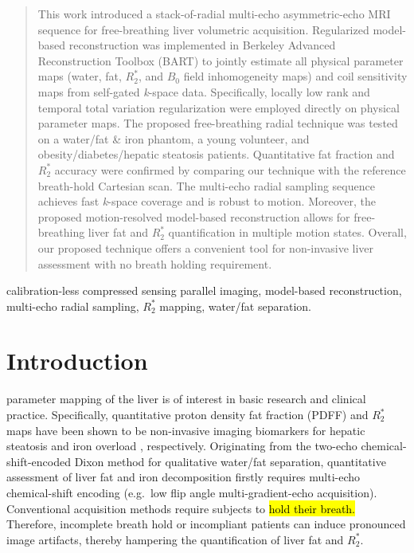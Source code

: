 \documentclass[journal,twoside,web]{ieeecolor}
\begin{document}
\begin{abstract}

This work introduced a stack-of-radial multi-echo asymmetric-echo MRI sequence 
for free-breathing liver volumetric acquisition. 
Regularized model-based reconstruction was implemented 
in Berkeley Advanced Reconstruction Toolbox (BART) 
to jointly estimate all physical parameter maps 
(water, fat, $R_2^*$, and $B_0$ field inhomogeneity maps) 
and coil sensitivity maps from self-gated \textit{k}-space data. 
Specifically, locally low rank and temporal total variation regularization 
were employed directly on physical parameter maps. 
The proposed free-breathing radial technique 
was tested on a water/fat \& iron phantom, a young volunteer, 
and obesity/diabetes/hepatic steatosis patients. 
Quantitative fat fraction and $R_2^*$ accuracy were confirmed 
by comparing our technique with the reference breath-hold Cartesian scan.
The multi-echo radial sampling sequence achieves 
fast \textit{k}-space coverage and is robust to motion. 
Moreover, the proposed motion-resolved model-based reconstruction 
allows for free-breathing liver fat and $R_2^*$ quantification 
in multiple motion states. 
Overall, our proposed technique offers a convenient tool 
for non-invasive liver assessment with no breath holding requirement.

\end{abstract}

\begin{IEEEkeywords}
calibration-less compressed sensing parallel imaging, model-based reconstruction, multi-echo radial sampling, $R_2^*$ mapping, water/fat separation.
\end{IEEEkeywords}

\section{Introduction}
\label{sec:introduction}

 parameter mapping of the liver is of interest 
in basic research and clinical practice. Specifically, quantitative 
proton density fat fraction (PDFF) and $R_2^*$ maps have been shown 
to be non-invasive imaging biomarkers for hepatic 
steatosis \cite{caussy_2018_fat,hu_2020_obesity} and 
iron overload \cite{wood_2011_iron,hernando_2014_iron}, respectively. 
Originating from the two-echo chemical-shift-encoded Dixon method 
\cite{dixon_1984_wf} for qualitative water/fat separation, 
quantitative assessment of liver fat and iron decomposition firstly requires 
multi-echo chemical-shift encoding (e.g.~low flip angle multi-gradient-echo acquisition). 
Conventional acquisition methods require subjects to \hl{hold their breath.}
Therefore, incomplete breath hold or incompliant patients can induce 
pronounced image artifacts, 
thereby hampering the quantification of liver fat and $R_2^*$.
\end{document}
